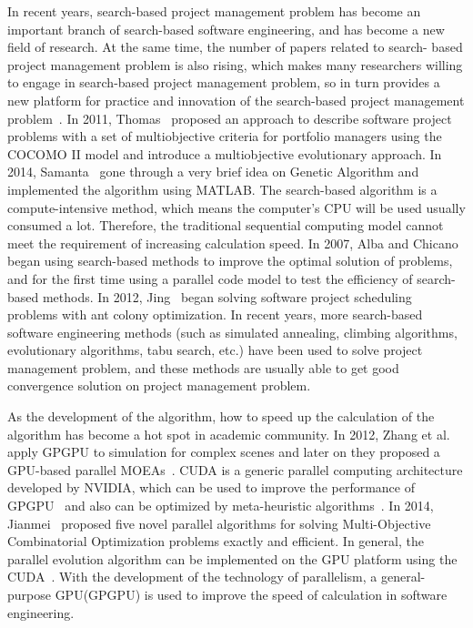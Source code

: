 In recent years, search-based project management problem has become an
important branch of search-based software engineering, and has become a new
field of research. At the same time, the number of papers related to search-
based project management problem is also rising, which makes many researchers
willing to engage in search-based project management problem, so in turn
provides a new platform for practice and innovation of the search-based
project management problem~\cite{penta}.
In 2011, Thomas~\cite{thomas} proposed an approach to describe software project problems
with a set of multiobjective criteria for portfolio managers using the COCOMO II model and
introduce a multiobjective evolutionary approach.
In 2014, Samanta~\cite{samanta} gone through a very brief idea on Genetic Algorithm and implemented the algorithm using MATLAB.
The search-based algorithm is a compute-intensive method, which means the
computer's CPU will be used usually consumed a lot. Therefore, the traditional
sequential computing model cannot meet the requirement of increasing calculation
speed. In 2007, Alba and Chicano~\cite{pospichal} began using search-based methods to improve the
optimal solution of problems, and for the first time using a parallel code model to test the efficiency of search-based methods.
In 2012, Jing~\cite{jing} began solving software project scheduling problems with ant colony optimization.
In recent years, more search-based software engineering methods (such as simulated
annealing, climbing algorithms, evolutionary algorithms, tabu search, etc.) have
been used to solve project management problem, and these methods are usually
able to get good convergence solution on project management problem.

As the development of the algorithm, how to speed up the calculation of the algorithm
has become a hot spot in academic community.
In 2012, Zhang et al.~\cite{zhang} apply GPGPU to
simulation for complex scenes and later on they proposed a GPU-based parallel MOEAs~\cite{li}.
CUDA is a generic parallel computing architecture developed by NVIDIA, which can be used to improve the performance of GPGPU~\cite{langdon2} and also can be optimized by meta-heuristic algorithms~\cite{langdon1,langdon3}.
In 2014, Jianmei~\cite{jianmei} proposed five novel parallel algorithms for solving 
Multi-Objective Combinatorial Optimization problems exactly and efficient.
In general, the parallel evolution algorithm can be implemented on the GPU platform using the CUDA~\cite{vidal}. With the development of the technology of parallelism, a general-purpose GPU(GPGPU) is used
to improve the speed of calculation in software engineering. 


